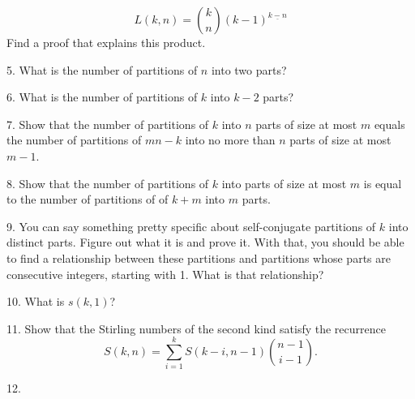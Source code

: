 \documentclass[10pt,]{book}
\theoremstyle{plain}
\theoremstyle{definition}
\theoremstyle{definition}
\numberwithin{equation}{chapter}
\newcommand{\importantarrow}{\Rightarrow}
\begin{document}
\begin{exerciselist}
\begin{equation*}
L(k,n) = \binom{k}{n}(k-1)^{\underline{k-n}}
\end{equation*}
Find a proof that explains this product.%
\par\smallskip
\item[5.]\marginsymbol[-1em]{} \hypertarget{exercise-27}{}\hypertarget{p-1020}{}%
What is the number of partitions of \(n\) into two parts?%
\par\smallskip
\item[6.]\marginsymbol[-1em]{} \hypertarget{partitions-k-2-parts}{}\hypertarget{p-1022}{}%
What is the number of partitions of \(k\) into \(k - 2\) parts?%
\par\smallskip
\item[7.]\marginsymbol[-1em]{} \hypertarget{exercise-29}{}\hypertarget{p-1024}{}%
Show that the number of partitions of \(k\) into \(n\) parts of size at most \(m\) equals the number of partitions of \(mn-k\) into no more than \(n\) parts of size at most \(m-1\).%
\par\smallskip
\item[8.]\marginsymbol[-1em]{} \hypertarget{exercise-30}{}\hypertarget{p-1026}{}%
Show that the number of partitions of \(k\) into parts of size at most \(m\) is equal to the number of partitions of of \(k+m\) into \(m\) parts.%
\par\smallskip
\item[9.]\marginsymbol[-1em]{} \hypertarget{exercise-31}{}\hypertarget{p-1028}{}%
You can say something pretty specific about self-conjugate partitions of \(k\) into distinct parts.  Figure out what it is and prove it.  With that, you should be able to find a relationship between these partitions and partitions whose parts are consecutive integers, starting with 1.  What is that relationship?%
\par\smallskip
\item[10.]\marginsymbol[-1em]{} \hypertarget{exercise-32}{}\hypertarget{p-1030}{}%
What is \(s(k,1)\)?%
\par\smallskip
\item[11.]\marginsymbol[-1em]{} \hypertarget{exercise-33}{}\hypertarget{p-1032}{}%
Show that the Stirling numbers of the second kind satisfy the recurrence%
\begin{equation*}
S(k,n) = \sum_{i=1}^kS(k-i,n-1)\binom{n-1}{i-1}\text{.}
\end{equation*}
%
\par\smallskip
\item[12.]\marginsymbol[-1em]{\pdftooltip{$\importantarrow$}{especially interesting}} \hypertarget{exercise-34}{}\hypertarget{p-1034}{}%

\end{exerciselist}
\end{document}
